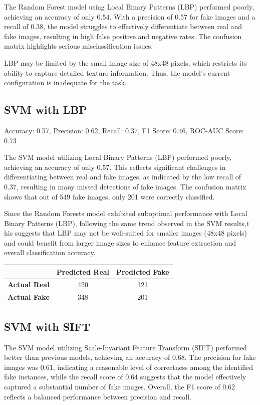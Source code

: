 \documentclass[10pt,twocolumn,letterpaper]{article}
\begin{document}
The Random Forest model using Local Binary Patterns (LBP) performed poorly, achieving an accuracy of only 0.54. With a precision of 0.57 for fake images and a recall of 0.38, the model struggles to effectively differentiate between real and fake images, resulting in high false positive and negative rates. The confusion matrix  highlights serious misclassification issues.

LBP may be limited by the small image size of 48x48 pixels, which restricts its ability to capture detailed texture information. Thus, the model's current configuration is inadequate for the task. 
\subsection{SVM with LBP}

Accuracy: 0.57, Precision: 0.62, Recall: 0.37, F1 Score: 0.46, ROC-AUC Score: 0.73

The SVM model utilizing Local Binary Patterns (LBP) performed poorly, achieving an accuracy of only 0.57. This reflects significant challenges in differentiating between real and fake images, as indicated by the low recall of 0.37, resulting in many missed detections of fake images. The confusion matrix shows that out of 549 fake images, only 201 were correctly classified. 

Since the Random Forests model exhibited suboptimal performance with Local Binary Patterns (LBP), following the same trend observed in the SVM results,t his suggests that LBP may not be well-suited for smaller images (48x48 pixels) and could benefit from larger image sizes to enhance feature extraction and overall classification accuracy.

\begin{table}[h]
    \centering
    \begin{tabular}{|c|c|c|}
        \hline
        & \textbf{Predicted Real} & \textbf{Predicted Fake} \\ \hline
        \textbf{Actual Real} & 420 & 121 \\ \hline
        \textbf{Actual Fake} & 348 & 201 \\ \hline
    \end{tabular}
\end{table}


\subsection{ SVM with SIFT}

The SVM model utilizing Scale-Invariant Feature Transform (SIFT) performed better than previous models, achieving an accuracy of 0.68. The precision for fake images was 0.61, indicating a reasonable level of correctness among the identified fake instances, while the recall score of 0.64 suggests that the model effectively captured a substantial number of fake images. Overall, the F1 score of 0.62 reflects a balanced performance between precision and recall.
\end{document}
